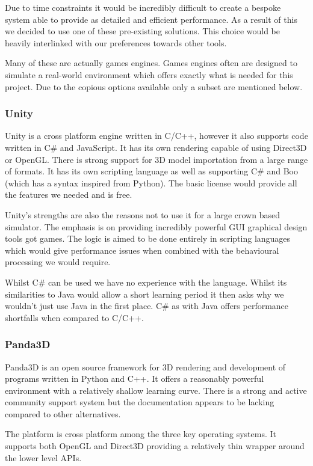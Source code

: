 Due to time constraints it would be incredibly difficult to create
a bespoke system able to provide as detailed and efficient performance.
As a result of this we decided to use one of these pre-existing solutions.
This choice would be heavily interlinked with our preferences towards
other tools.

Many of these are actually games engines. Games engines often are
designed to simulate a real-world environment which offers exactly
what is needed for this project. Due to the copious options available
only a subset are mentioned below.


\subsubsection{Unity }

Unity is a cross platform engine written in C/C++, however it also
supports code written in C\# and JavaScript. It has its own rendering
capable of using Direct3D or OpenGL. There is strong support for 3D
model importation from a large range of formats. It has its own scripting
language as well as supporting C\# and Boo (which has a syntax inspired
from Python). The basic license would provide all the features we
needed and is free.

Unity's strengths are also the reasons not to use it for a large crown
based simulator. The emphasis is on providing incredibly powerful
GUI graphical design tools got games. The logic is aimed to be done
entirely in scripting languages which would give performance issues
when combined with the behavioural processing we would require.

Whilst C\# can be used we have no experience with the language. Whilst
its similarities to Java would allow a short learning period it then
asks why we wouldn't just use Java in the first place. C\# as with
Java offers performance shortfalls when compared to C/C++.


\subsubsection{Panda3D}

Panda3D is an open source framework for 3D rendering and development
of programs written in Python and C++. It offers a reasonably powerful
environment with a relatively shallow learning curve. There is a strong
and active community support system but the documentation appears
to be lacking compared to other alternatives.

The platform is cross platform among the three key operating systems.
It supports both OpenGL and Direct3D providing a relatively thin wrapper
around the lower level APIs.

